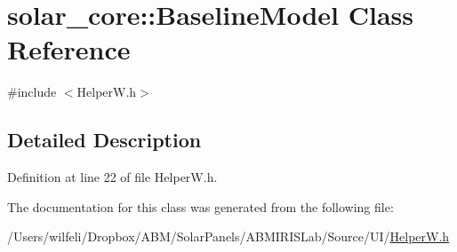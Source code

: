 \hypertarget{classsolar__core_1_1_baseline_model}{}\section{solar\+\_\+core\+:\+:Baseline\+Model Class Reference}
\label{classsolar__core_1_1_baseline_model}


{\ttfamily \#include $<$Helper\+W.\+h$>$}



\subsection{Detailed Description}


Definition at line 22 of file Helper\+W.\+h.



The documentation for this class was generated from the following file\+:\begin{DoxyCompactItemize}
\item 
/\+Users/wilfeli/\+Dropbox/\+A\+B\+M/\+Solar\+Panels/\+A\+B\+M\+I\+R\+I\+S\+Lab/\+Source/\+U\+I/\hyperlink{_helper_w_8h}{Helper\+W.\+h}\end{DoxyCompactItemize}
